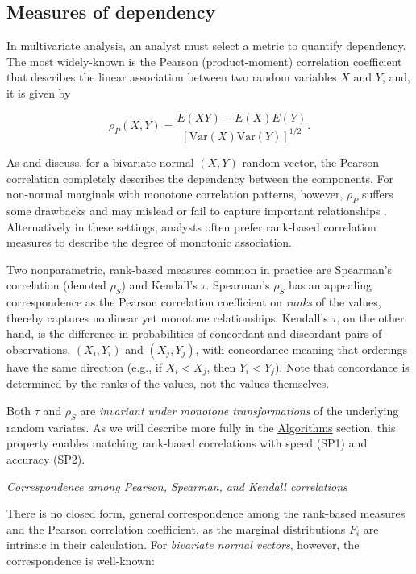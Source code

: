 \documentclass[
]{jss}
\begin{document}
\hypertarget{measures-of-dependency}{%
\subsection{Measures of dependency}\label{measures-of-dependency}}

In multivariate analysis, an analyst must select a metric to quantify
dependency. The most widely-known is the Pearson (product-moment)
correlation coefficient that describes the linear association between
two random variables \(X\) and \(Y\), and, it is given by

\begin{equation}
\rho_P(X,Y) = \frac{E(XY) - E(X)E(Y)}{\left[ \mathrm{Var}(X)\mathrm{Var}(Y)\right]^{1/2}}.
\label{eq:pearson}
\end{equation}

As \citet{MB13} and \citet{MK01} discuss, for a bivariate normal
\((X,Y)\) random vector, the Pearson correlation completely describes
the dependency between the components. For non-normal marginals with
monotone correlation patterns, however, \(\rho_P\) suffers some
drawbacks and may mislead or fail to capture important relationships
\citep{MK01}. Alternatively in these settings, analysts often prefer
rank-based correlation measures to describe the degree of monotonic
association.

Two nonparametric, rank-based measures common in practice are Spearman's
correlation (denoted \(\rho_S\)) and Kendall's \(\tau\). Spearman's
\(\rho_S\) has an appealing correspondence as the Pearson correlation
coefficient on \emph{ranks} of the values, thereby captures nonlinear
yet monotone relationships. Kendall's \(\tau\), on the other hand, is
the difference in probabilities of concordant and discordant pairs of
observations, \((X_i, Y_i)\) and \((X_j, Y_j)\), with concordance
meaning that orderings have the same direction (e.g., if \(X_i < X_j\),
then \(Y_i < Y_j\)). Note that concordance is determined by the ranks of
the values, not the values themselves.

Both \(\tau\) and \(\rho_S\) are \emph{invariant under monotone
transformations} of the underlying random variates. As we will describe
more fully in the \protect\hyperlink{algorithms}{Algorithms} section,
this property enables matching rank-based correlations with speed (SP1)
and accuracy (SP2).

\emph{Correspondence among Pearson, Spearman, and Kendall correlations}

There is no closed form, general correspondence among the rank-based
measures and the Pearson correlation coefficient, as the marginal
distributions \(F_i\) are intrinsic in their calculation. For
\emph{bivariate normal vectors}, however, the correspondence is
well-known:
\end{document}
